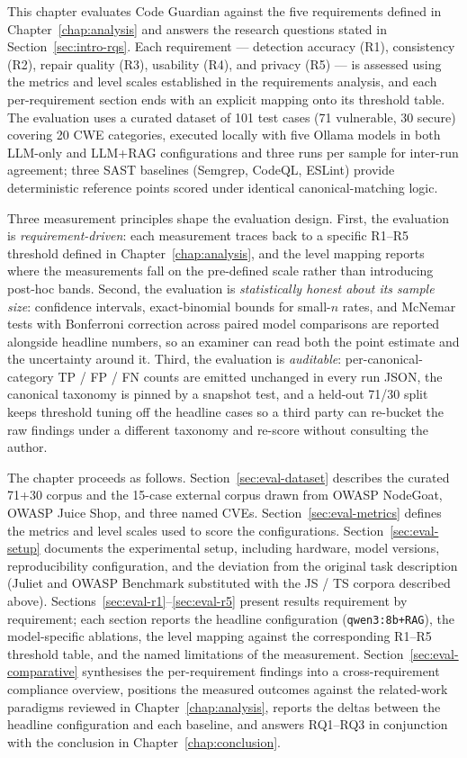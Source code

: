 This chapter evaluates Code Guardian against the five requirements defined in Chapter~\ref{chap:analysis} and answers the research questions stated in Section~\ref{sec:intro-rqs}. Each requirement --- detection accuracy (R1), consistency (R2), repair quality (R3), usability (R4), and privacy (R5) --- is assessed using the metrics and level scales established in the requirements analysis, and each per-requirement section ends with an explicit mapping onto its threshold table. The evaluation uses a curated dataset of 101 test cases (71 vulnerable, 30 secure) covering 20 CWE categories, executed locally with five Ollama models in both LLM-only and LLM+RAG configurations and three runs per sample for inter-run agreement; three SAST baselines (Semgrep, CodeQL, ESLint) provide deterministic reference points scored under identical canonical-matching logic.

Three measurement principles shape the evaluation design. First, the evaluation is \emph{requirement-driven}: each measurement traces back to a specific R1--R5 threshold defined in Chapter~\ref{chap:analysis}, and the level mapping reports where the measurements fall on the pre-defined scale rather than introducing post-hoc bands. Second, the evaluation is \emph{statistically honest about its sample size}: confidence intervals, exact-binomial bounds for small-$n$ rates, and McNemar tests with Bonferroni correction across paired model comparisons are reported alongside headline numbers, so an examiner can read both the point estimate and the uncertainty around it. Third, the evaluation is \emph{auditable}: per-canonical-category TP / FP / FN counts are emitted unchanged in every run JSON, the canonical taxonomy is pinned by a snapshot test, and a held-out 71/30 split keeps threshold tuning off the headline cases so a third party can re-bucket the raw findings under a different taxonomy and re-score without consulting the author.

The chapter proceeds as follows. Section~\ref{sec:eval-dataset} describes the curated 71+30 corpus and the 15-case external corpus drawn from OWASP NodeGoat, OWASP Juice Shop, and three named CVEs. Section~\ref{sec:eval-metrics} defines the metrics and level scales used to score the configurations. Section~\ref{sec:eval-setup} documents the experimental setup, including hardware, model versions, reproducibility configuration, and the deviation from the original task description (Juliet and OWASP Benchmark substituted with the JS / TS corpora described above). Sections~\ref{sec:eval-r1}--\ref{sec:eval-r5} present results requirement by requirement; each section reports the headline configuration (\texttt{qwen3:8b+RAG}), the model-specific ablations, the level mapping against the corresponding R1--R5 threshold table, and the named limitations of the measurement. Section~\ref{sec:eval-comparative} synthesises the per-requirement findings into a cross-requirement compliance overview, positions the measured outcomes against the related-work paradigms reviewed in Chapter~\ref{chap:analysis}, reports the deltas between the headline configuration and each baseline, and answers RQ1--RQ3 in conjunction with the conclusion in Chapter~\ref{chap:conclusion}.

